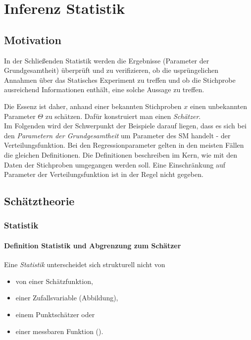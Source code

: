 \pagebreak

\section{Inferenz Statistik}

\subsection{Motivation}

In der Schließenden Statistik werden die Ergebnisse (Parameter der Grundgesamtheit) überprüft und zu verifizieren, ob die usprüngelichen Annahmen über das Statisches Experiment zu treffen und ob die Stichprobe ausreichend Informationen enthält, eine solche Aussage zu treffen.
 
Die Essenz ist daher, anhand einer bekannten Stichproben $x$ einen unbekannten Parameter $\varTheta$ zu schätzen. Dafür konstruiert man einen \textit{Schätzer}.\\

Im Folgenden wird der Schwerpunkt der Beispiele darauf liegen, dass es sich bei den \textit{Parametern der Grundgesamtheit} um Parameter des \gls{SM} handelt - der Verteilungsfunktion. Bei den Regressionparameter gelten in den meisten Fällen die gleichen Definitionen. Die Definitionen beschreiben im Kern, wie mit den Daten der Stichproben umgegangen werden soll. Eine Einschränkung auf Parameter der Verteilungsfunktion ist in der Regel nicht gegeben.

\subsection{Schätztheorie}
\subsubsection{Statistik}
\paragraph{Definition Statistik und Abgrenzung zum Schätzer}
Eine \textit{Statistik} unterscheidet sich strukturell nicht von
\begin{itemize}
	\item von einer Schätzfunktion,
	\item einer Zufallsvariable (Abbildung),
	\item einem Punktschätzer oder
	\item einer messbaren Funktion ().
\end{itemize}

